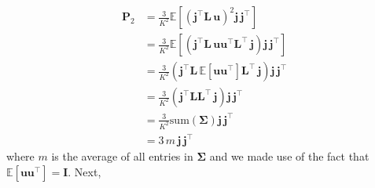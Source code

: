 \documentclass[modern]{aastex62}
\begin{document}
    \begin{align}
        \mathbf{P}_2 & = \frac{3}{K^2}\mathbb{E}\left[ \left(\mathbf{j}^\top \mathbf{L} \, \mathbf{u}\right)^2 \mathbf{j} \, \mathbf{j}^\top \right]
        \nonumber                                                                                                                                                                                   \\
                     & = \frac{3}{K^2}\mathbb{E}\left[\left(\mathbf{j}^\top \mathbf{L} \,  \mathbf{u} \mathbf{u}^\top  \mathbf{L}^\top \, \mathbf{j} \right)  \mathbf{j} \, \mathbf{j}^\top \right]
        \nonumber                                                                                                                                                                                   \\
                     & = \frac{3}{K^2}\left(\mathbf{j}^\top \mathbf{L} \, \mathbb{E}\left[ \mathbf{u} \mathbf{u}^\top \right] \mathbf{L}^\top \, \mathbf{j} \right)  \mathbf{j} \, \mathbf{j}^\top
        \nonumber                                                                                                                                                                                   \\
                     & = \frac{3}{K^2}\left(\mathbf{j}^\top \mathbf{L} \mathbf{L}^\top \, \mathbf{j} \right)  \mathbf{j} \, \mathbf{j}^\top
        \nonumber                                                                                                                                                                                   \\
                     & = \frac{3}{K^2}\mathrm{sum}(\mathbf{\Sigma}) \mathbf{j} \, \mathbf{j}^\top
        \nonumber                                                                                                                                                                                   \\
                     & = 3 \, m \, \mathbf{j} \, \mathbf{j}^\top
    \end{align}
    where $m$ is the average of all entries in $\pmb{\Sigma}$ and
    we made use of the fact that $\mathbb{E}\left[ \mathbf{u} \mathbf{u}^\top\right] = \mathbf{I}$.
    Next,
\end{document}

